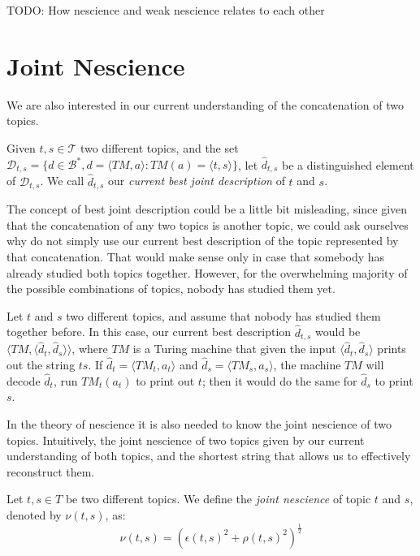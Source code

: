 {\color{red} TODO: How nescience and weak nescience relates to each other}

%
%

\section{Joint Nescience}

We are also interested in our current understanding of the concatenation of two topics.

\begin{definition}
Given $t,s \in \mathcal{T}$ two different topics, and the set $\mathcal{D}_{t,s} = \{ d \in \mathcal{B}^\ast, d = \langle TM,a \rangle : TM(a) = \langle t,s \rangle \}$, let $\hat{d}_{t,s}$ be a distinguished element of $\mathcal{D}_{t,s}$. We call $\hat{d}_{t,s}$ our \emph{current best joint description} of $t$ and $s$.
\end{definition}

The concept of best joint description could be a little bit misleading, since given that the concatenation of any two topics is another topic, we could ask ourselves why do not simply use our current best description of the topic represented by that concatenation. That would make sense only in case that somebody has already studied both topics together. However, for the overwhelming majority of the possible combinations of topics, nobody has studied them yet.

\begin{example}
\label{ex:unknown_join}
Let $t$ and $s$ two different topics, and assume that nobody has studied them together before. In this case, our current best description $\hat{d}_{t, s}$ would be $\langle TM, \langle \hat{d}_t, \hat{d}_s \rangle \rangle$, where $TM$ is a Turing machine that given the input $\langle \hat{d}_t, \hat{d}_s \rangle$ prints out the string $ts$. If $\hat{d}_t = \langle TM_t, a_t \rangle$ and $\hat{d}_s = \langle TM_s, a_s \rangle$, the machine $TM$ will decode $\hat{d}_t$, run $TM_t(a_t)$ to print out $t$; then it would do the same for $\hat{d}_s$ to print $s$.
\end{example}

In the theory of nescience it is also needed to know the joint nescience of two topics. Intuitively, the joint nescience of two topics given by our current understanding of both topics, and the shortest string that allows us to effectively reconstruct them.

\begin{definition}
Let $t,s \in T$ be two different topics. We define the \emph{joint nescience} of topic $t$ and $s$, denoted by $\nu(t,s)$, as: 
\[
\nu(t, s) = \left( \epsilon\left( t, s \right)^2 + \rho\left( t,s \right)^2 \right) ^ \frac{1}{2}
\]
\end{definition}

